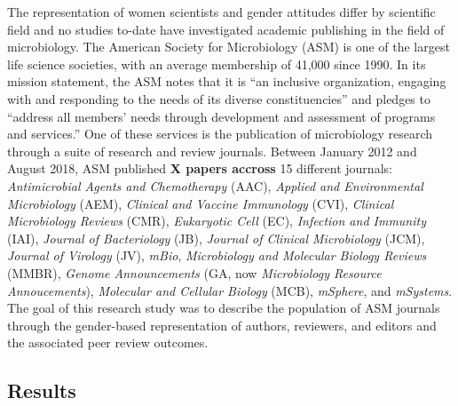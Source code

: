 \documentclass[11pt,]{article}
\begin{document}
The representation of women scientists and gender attitudes differ by
scientific field and no studies to-date have investigated academic
publishing in the field of microbiology. The American Society for
Microbiology (ASM) is one of the largest life science societies, with an
average membership of 41,000 since 1990. In its mission statement, the
ASM notes that it is ``an inclusive organization, engaging with and
responding to the needs of its diverse constituencies'' and pledges to
``address all members' needs through development and assessment of
programs and services.'' One of these services is the publication of
microbiology research through a suite of research and review journals.
Between January 2012 and August 2018, ASM published \textbf{X papers
accross} 15 different journals: \emph{Antimicrobial Agents and
Chemotherapy} (AAC), \emph{Applied and Environmental Microbiology}
(AEM), \emph{Clinical and Vaccine Immunology} (CVI), \emph{Clinical
Microbiology Reviews} (CMR), \emph{Eukaryotic Cell} (EC),
\emph{Infection and Immunity} (IAI), \emph{Journal of Bacteriology}
(JB), \emph{Journal of Clinical Microbiology} (JCM), \emph{Journal of
Virology} (JV), \emph{mBio}, \emph{Microbiology and Molecular Biology
Reviews} (MMBR), \emph{Genome Announcements} (GA, now \emph{Microbiology
Resource Annoucements}), \emph{Molecular and Cellular Biology} (MCB),
\emph{mSphere}, and \emph{mSystems}. The goal of this research study was
to describe the population of ASM journals through the gender-based
representation of authors, reviewers, and editors and the associated
peer review outcomes.

\subsection{Results}\label{results}
\end{document}
